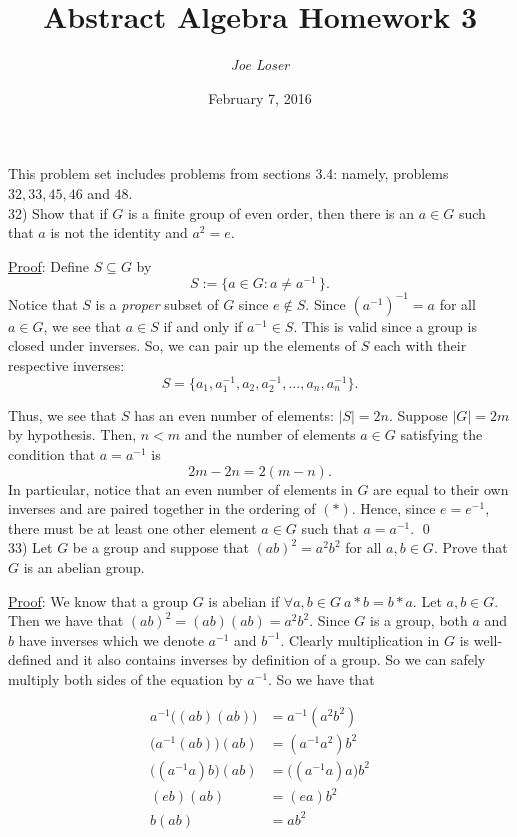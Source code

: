 \documentclass{article}
\title{Abstract Algebra Homework 3}
\author{\textit{Joe Loser}}
\date{February 7, 2016}
\begin{document}
\maketitle

This problem set includes problems from sections 3.4: namely, problems $32, 33, 45, 46$ and $48$.\\

32) Show that if $G$ is a finite group of even order, then there is an $a \in G$ such that $a$ is not the identity and $a^{2} = e$.

\underline{Proof}: Define $S \subseteq G$ by 
	$$ S := \{a \in G : a \neq a^{-1}\,\}. $$
Notice that $S$ is a \textit{proper} subset of $G$ since $e \notin S.$ Since $(a^{-1})^{-1} = a$ for all $a \in G$, we see that $a \in S$ if and only if $a^{-1} \in S$. This is valid since a group is closed under inverses. So, we can pair up the elements of $S$ each with their respective inverses:
\begin{equation}
	S = \{a_1, a_1^{-1}, a_2, a_2^{-1}, ..., a_n, a_n^{-1}\} \tag{*}. 
\end{equation}

Thus, we see that $S$ has an even number of elements: $\lvert S \rvert = 2n$. Suppose $\lvert G \rvert = 2m$ by hypothesis. Then, $n < m$ and the number of elements $a \in G$ satisfying the condition that $a = a^{-1}$ is
	$$2m - 2n = 2(m - n) .$$
In particular, notice that an even number of elements in $G$ are equal to their own inverses and are paired together in the ordering of $(*)$. Hence, since $e = e^{-1}$, there must be at least one other element $a \in G$ such that $a = a^{-1}$.	 \qed \\

33) Let $G$ be a group and suppose that $(ab)^{2} = a^{2}b^{2}$ for all $a, b \in G$. Prove that $G$ is an abelian group. 

\underline{Proof}: We know that a group $G$ is abelian if  $\forall a, b \in G \ a * b = b * a. $ Let $a, b \in G$. Then we have that $(ab)^2 = (ab)(ab) = a^{2}b^{2}.$ Since $G$ is a group, both $a$ and $b$ have inverses which we denote $a^{-1}$ and $b^{-1}$. Clearly multiplication in $G$ is well-defined and it also contains inverses by definition of a group. So we can safely multiply both sides of the equation by $a^{-1}$. So we have that

\begin{align*}
	a^{-1} \big((ab)(ab)\big) &= a^{-1}(a^{2}b^{2}) \\
	\big( a^{-1} (ab) \big) (ab) &= (a^{-1}a^{2})b^2 \\
	\big( (a^{-1}a) b \big) (ab) &= \big( (a^{-1} a) a \big) b^2 \\
	(eb) (ab) &= (ea) b^2 \\
	b(ab) &= ab^2  \tag{1}
\end{align*}
\end{document}
